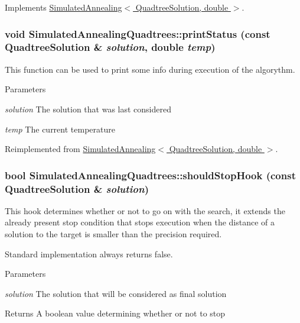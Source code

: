 Implements \hyperlink{class_simulated_annealing_a71b64ea8dca2d5bba7fb6d4b6cde1c81}{SimulatedAnnealing$<$ QuadtreeSolution, double $>$}.\hypertarget{class_simulated_annealing_quadtrees_a4228034780e8cdebe3beb9c89a646373}{
\subsubsection[{printStatus}]{\setlength{\rightskip}{0pt plus 5cm}void SimulatedAnnealingQuadtrees::printStatus (const {\bf QuadtreeSolution} \& {\em solution}, \/  double {\em temp})}}
\label{class_simulated_annealing_quadtrees_a4228034780e8cdebe3beb9c89a646373}
This function can be used to print some info during execution of the algorythm. 
\begin{DoxyParams}{Parameters}
\item[{\em solution}]The solution that was last considered \item[{\em temp}]The current temperature \end{DoxyParams}


Reimplemented from \hyperlink{class_simulated_annealing_accc3e21d0c77ac87ce604f17e014c11d}{SimulatedAnnealing$<$ QuadtreeSolution, double $>$}.\hypertarget{class_simulated_annealing_quadtrees_ae402bb212c241a07477e46348f889fdf}{
\subsubsection[{shouldStopHook}]{\setlength{\rightskip}{0pt plus 5cm}bool SimulatedAnnealingQuadtrees::shouldStopHook (const {\bf QuadtreeSolution} \& {\em solution})}}
\label{class_simulated_annealing_quadtrees_ae402bb212c241a07477e46348f889fdf}
This hook determines whether or not to go on with the search, it extends the already present stop condition that stops execution when the distance of a solution to the target is smaller than the precision required.

Standard implementation always returns false. 
\begin{DoxyParams}{Parameters}
\item[{\em solution}]The solution that will be considered as final solution \end{DoxyParams}
\begin{DoxyReturn}{Returns}
A boolean value determining whether or not to stop 
\end{DoxyReturn}


